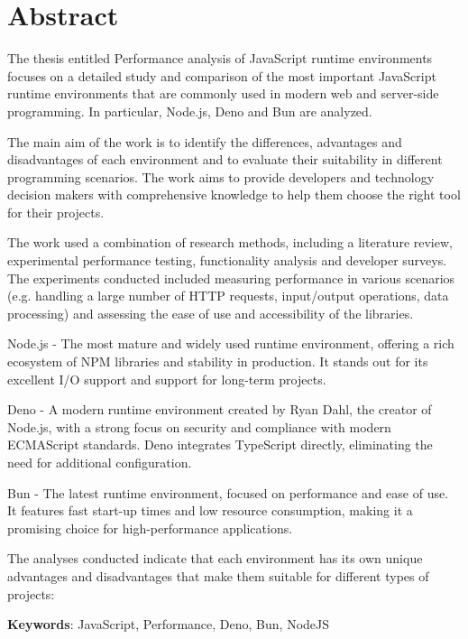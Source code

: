 \section*{Abstract}
The thesis entitled Performance analysis of JavaScript runtime environments focuses on a detailed study and comparison of the most important JavaScript runtime environments that are commonly used in modern web and server-side programming. In particular, Node.js, Deno and Bun are analyzed.

The main aim of the work is to identify the differences, advantages and disadvantages of each environment and to evaluate their suitability in different programming scenarios. The work aims to provide developers and technology decision makers with comprehensive knowledge to help them choose the right tool for their projects.

The work used a combination of research methods, including a literature review, experimental performance testing, functionality analysis and developer surveys. The experiments conducted included measuring performance in various scenarios (e.g. handling a large number of HTTP requests, input/output operations, data processing) and assessing the ease of use and accessibility of the libraries.

Node.js - The most mature and widely used runtime environment, offering a rich ecosystem of NPM libraries and stability in production. It stands out for its excellent I/O support and support for long-term projects.

Deno - A modern runtime environment created by Ryan Dahl, the creator of Node.js, with a strong focus on security and compliance with modern ECMAScript standards. Deno integrates TypeScript directly, eliminating the need for additional configuration.

Bun - The latest runtime environment, focused on performance and ease of use. It features fast start-up times and low resource consumption, making it a promising choice for high-performance applications.

The analyses conducted indicate that each environment has its own unique advantages and disadvantages that make them suitable for different types of projects:

\bigskip

\textbf{Keywords}: JavaScript, Performance, Deno, Bun, NodeJS
